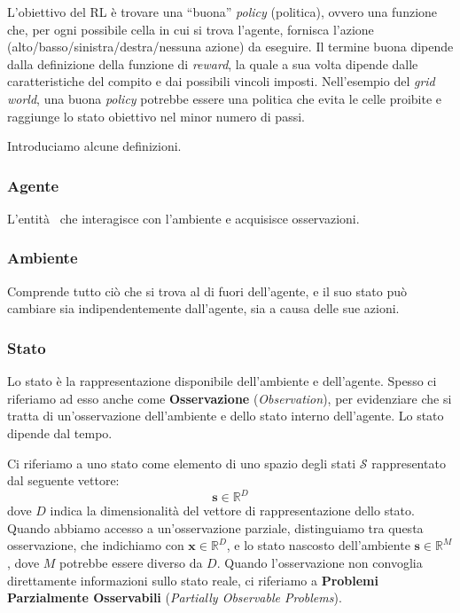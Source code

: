 ﻿\documentclass[11pt, a4paper]{report}
\begin{document}
L'obiettivo del RL è trovare una ``buona'' \emph{policy} (politica), ovvero una funzione che, per ogni possibile cella in cui si trova l'agente, fornisca l'azione (alto/basso/sinistra/destra/nessuna azione) da eseguire. Il termine buona dipende dalla definizione della funzione di \emph{reward}, la quale a sua volta dipende dalle caratteristiche del compito e dai possibili vincoli imposti. Nell'esempio del \emph{grid world}, una buona \emph{policy} potrebbe essere una politica che evita le celle proibite e raggiunge lo stato obiettivo nel minor numero di passi.

\newpage


Introduciamo alcune definizioni.

\subsubsection{Agente}

L'entità  che interagisce con l'ambiente e acquisisce osservazioni.

\subsubsection{Ambiente}

Comprende tutto ciò che si trova al di fuori dell'agente, e il suo stato può cambiare sia indipendentemente dall'agente, sia a causa delle sue azioni.

\subsubsection{Stato}

Lo stato è la rappresentazione disponibile dell'ambiente e dell'agente. Spesso ci riferiamo ad esso anche come \textbf{Osservazione} (\emph{Observation}), per evidenziare che si tratta di un'osservazione dell'ambiente e dello stato interno dell'agente. Lo stato dipende dal tempo.

Ci riferiamo a uno stato come elemento di uno spazio degli stati $\mathcal{S}$ rappresentato dal seguente vettore:
\begin{equation}
\bm{s} \in \mathbb{R}^D
\end{equation}
dove $D$ indica la dimensionalità del vettore di rappresentazione dello stato. Quando abbiamo accesso a un'osservazione parziale, distinguiamo tra questa osservazione, che indichiamo con $\bm{x} \in \mathbb{R}^D$, e lo stato nascosto dell'ambiente $\bm{s} \in \mathbb{R}^M$, dove $M$ potrebbe essere diverso da $D$. Quando l'osservazione non convoglia direttamente informazioni sullo stato reale, ci riferiamo a \textbf{Problemi Parzialmente Osservabili} (\emph{Partially Observable Problems}).
\end{document}
